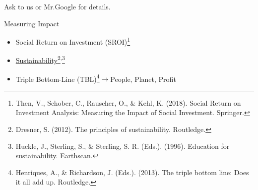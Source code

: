\documentclass[dvipdfmx,10pt]{beamer}
\newcommand{\ft}{\frametitle}
\begin{document}
\begin{frame}\ft{\insertsection}
Ask to us or Mr.Google for details.
\begin{exampleblock}{Measuring Impact}
\begin{itemize}
\item Social Return on Investment (SROI)\footnote{Then, V., Schober, C., Rauscher, O., \& Kehl, K. (2018). Social Return on Investment Analysis: Measuring the Impact of Social Investment. Springer.}
\item \href{https://en.wikipedia.org/wiki/Sustainability}{Sustainability}\footnote{Dresner, S. (2012). The principles of sustainability. Routledge.}\textsuperscript{,}\footnote{Huckle, J., Sterling, S., \& Sterling, S. R. (Eds.). (1996). Education for sustainability. Earthscan.}
\item Triple Bottom-Line (TBL)\footnote{Henriques, A., \& Richardson, J. (Eds.). (2013). The triple bottom line: Does it all add up. Routledge.}$\to$People, Planet, Profit
\end{itemize}
\end{exampleblock}
\end{frame}
\end{document}
